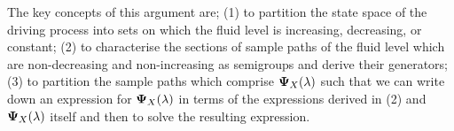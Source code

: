 The key concepts of this argument are; (1) to partition the state space of the driving process into sets on which the fluid level is increasing, decreasing, or constant; (2) to characterise the sections of sample paths of the fluid level which are non-decreasing and non-increasing as semigroups and derive their generators; (3) to partition the sample paths which comprise \(\boldsymbol \Psi_X(\lambda)\) such that we can write down an expression for \(\boldsymbol \Psi_X(\lambda)\) in terms of the expressions derived in (2) and \(\boldsymbol \Psi_X(\lambda)\) itself and then to solve the resulting expression. 






